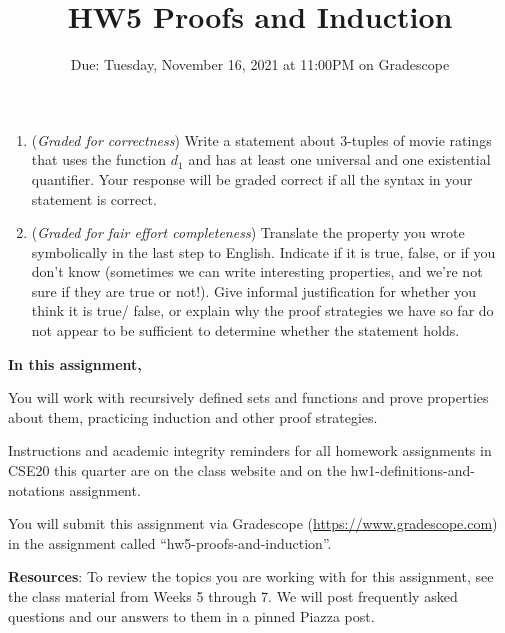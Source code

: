 \begin{enumerate}
\begin{enumerate}
    \item ({\it Graded for correctness}) Write a statement about 3-tuples of movie ratings that uses the function 
    $d_1$ and has at least one universal and one existential quantifier. Your response will be 
    graded correct if all the syntax in your statement is correct.

    \item ({\it Graded for fair effort completeness}) Translate the property you wrote symbolically in the 
    last step to English. Indicate if it is true, false, or if you don't know 
    (sometimes we can write interesting properties, and we're not sure if they are true or not!). 
    Give informal justification for whether  you think it is true/ false, or explain why 
    the proof strategies we have so far do not appear to  be sufficient to determine whether the statement holds.
    \end{enumerate}

\end{enumerate}
\newpage

\title{HW5 Proofs and Induction}
\date{Due: Tuesday, November 16, 2021 at 11:00PM on Gradescope}


\maketitle
\thispagestyle{fancy}

{\bf In this assignment,}

You will work with recursively defined sets and functions and prove 
properties about them, practicing induction and other proof strategies.

Instructions and academic integrity reminders for all homework assignments in 
CSE20 this quarter are on the class website and on the hw1-definitions-and-notations
assignment.

You will submit this assignment via Gradescope
(\href{https://www.gradescope.com}{https://www.gradescope.com}) 
in the assignment called ``hw5-proofs-and-induction''.

{\bf Resources}: To review the topics you are working with 
for this assignment, see the class material from Weeks 5 through 7.
We will post frequently asked questions and our answers to them in a 
pinned Piazza post.


